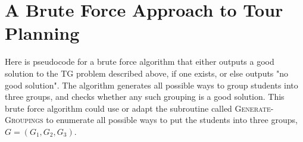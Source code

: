 \documentclass[11pt,fleqn]{exam}
\newcommand{\fillinMCmath}[1]{\begin{tikzpicture}\draw circle [radius=0.5em];\end{tikzpicture}\ #1}
\newif\ifsolutions\solutionsfalse
\begin{document}
\begin{questions}


%     

%     


%     
    

%     
\end{questions}

\clearpage

\section{A Brute Force Approach to Tour Planning}
Here is pseudocode for a brute force algorithm that either outputs a good solution to the TG problem described above, if one exists, or else outputs "no good solution". The algorithm generates all possible ways to group students into three groups, and checks whether any such grouping is a good solution. This brute force algorithm could use or adapt the subroutine called \textsc{Generate-Groupings} to enumerate all possible ways to put the students into three groups, $G = (G_1,G_2,G_3)$. 

\vspace{.2in}
\end{document}
